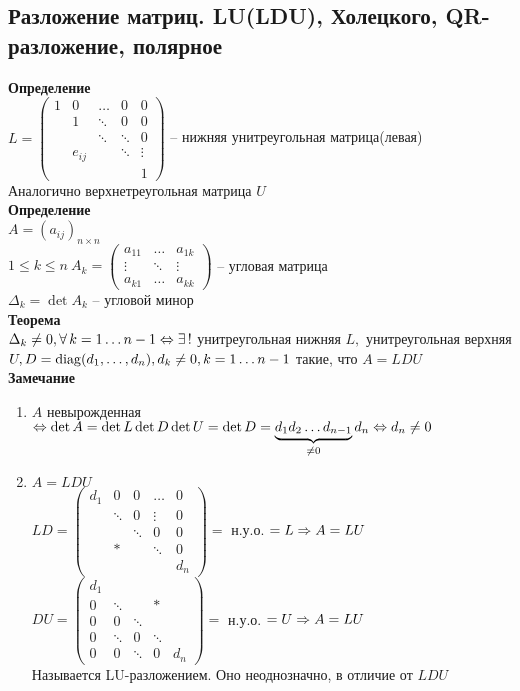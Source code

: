 \documentclass[12pt]{article}
\begin{document}
\subsection{Разложение матриц. LU(LDU), Холецкого, QR-разложение, полярное}
\textbf{Определение}\\
$L = \begin{pmatrix}
    1 & 0 & \ldots & 0 & 0\\
    & 1 & \ddots & 0 & 0\\
    & & \ddots & \ddots & 0\\
    & e_{ij} & & \ddots & \vdots\\
    & & & & 1
\end{pmatrix}$ -- нижняя унитреугольная матрица(левая)\\
Аналогично верхнетреугольная матрица $U$\\
\textbf{Определение}\\
$A = (a_{ij})_{n\times n}$\\
$1 \leq k \leq n\ A_k = \begin{pmatrix}
    a_{11} & \ldots & a_{1k}\\
    \vdots & \ddots & \vdots\\
    a_{k1} & \ldots & a_{kk}
\end{pmatrix}$ -- угловая матрица\\
$\Delta_k = \det A_k$ -- угловой минор\\
\textbf{Теорема}\\
$\Delta_k \neq 0, \fall k=1\ldots n-1 \LRto \ex!$ унитреугольная нижняя $L, $ унитреугольная верхняя $U, D = \nm{diag}(d_1, \ldots, d_n), d_k\neq 0, k=1\ldots n-1$ такие, что $A = LDU$\\
\textbf{Замечание}
\begin{enumerate}
    \item $A$ невырожденная $\LRto \det A = \det L \det D \det U = \det D = \ub{\neq 0}{d_1d_2\ldots d_{n-1}} d_n \LRto d_n \neq 0$
    \item $A=LDU$\\
    $LD = \begin{pmatrix}
        d_1 & 0 & 0 & \ldots & 0\\
        & \ddots & 0 &\vdots & 0\\
        & & \ddots & 0 & 0\\
        & * & & \ddots & 0\\
        & & & & d_n
    \end{pmatrix} = $ н.у.о. $= L \Rto A = LU$\\
    $DU = \begin{pmatrix}
        d_1 & & & &\\
        0 & \ddots & & * &\\
        0 & 0 & \ddots & &\\
        0 & \ddots & 0 & \ddots &\\
        0 & 0 & \ddots & 0 & d_n
    \end{pmatrix} = $ н.у.о. $= U \Rto A = LU$\\
    Называется LU-разложением. Оно неоднозначно, в отличие от $LDU$
\end{enumerate}
\end{document}
